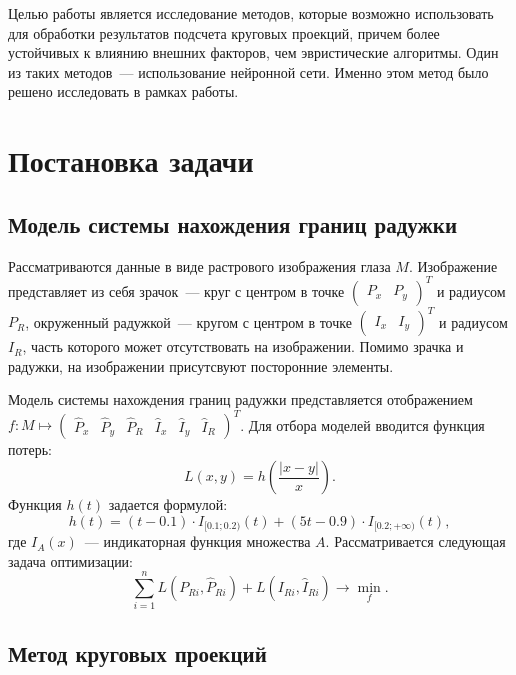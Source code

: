 \documentclass[12pt, twoside]{article}
\begin{document}
Целью работы является исследование методов, которые возможно использовать для обработки результатов подсчета круговых проекций, причем более устойчивых к влиянию внешних факторов, чем эвристические алгоритмы. Один из таких методов~--- использование нейронной сети. Именно этом метод было решено исследовать в рамках работы.

\section{Постановка задачи}
\subsection{Модель системы нахождения границ радужки}

Рассматриваются данные в виде растрового изображения глаза $M$. Изображение представляет из себя зрачок~--- круг с центром в точке $\begin{pmatrix}P_x & P_y\end{pmatrix}^T$ и радиусом $P_R$, окруженный радужкой~--- кругом с центром в точке $\begin{pmatrix}I_x & I_y\end{pmatrix}^T$ и радиусом $I_R$, часть которого может отсутствовать на изображении.  Помимо зрачка и радужки, на изображении присутсвуют посторонние элементы.

Модель системы нахождения границ радужки представляется отображением $f\!: M \mapsto \begin{pmatrix}\widehat{P}_x & \widehat{P}_y & \widehat{P}_R & \widehat{I}_x & \widehat{I}_y & \widehat{I}_R\end{pmatrix}^T$. Для отбора моделей вводится функция потерь:
 \[
  L(x, y) = h\left(\frac{|x-y|}{x}\right).
 \]
 Функция $h(t)$ задается формулой:
\[
h(t) = (t-0.1) \cdot I_{[0.1; 0.2)}(t) + (5t-0.9) \cdot I_{[0.2; +\infty)}(t),
\] %
где $I_A(x)$~--- индикаторная функция множества $A$. Рассматривается следующая задача оптимизации:
\begin{equation}
\sum_{i=1}^n   L\left(P_{Ri}, \widehat{P}_{Ri}\right)  + L\left(I_{Ri}, \widehat{I}_{Ri}\right) \to \min_f.
\end{equation}

\subsection{Метод круговых проекций}
\end{document}
